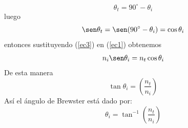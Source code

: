 \documentclass[13,twocolumn,letterpaper]{article}
\begin{document}
{\begin{equation}
		\theta_{t}=90^{\circ}-\theta_{i}
		\end{equation}
		luego 
		\begin{equation}\label{ec3}
		\sen\theta_{t}=\sen(90^{\circ}-\theta_{i})=\cos\theta_{i}
		\end{equation}
		entonces sustituyendo (\ref{ec3}) en (\ref{ec1}) obtenemos 
		\begin{equation}\label{ec4}
		n_{i}\sen\theta_{i}=n_{t}\cos\theta_{i}
		\end{equation}
		De esta manera 
		\begin{equation}\label{ec5}
		\tan\theta_{i}=\left(\dfrac{n_{t}}{n_{i}}\right)
		\end{equation}
		Así el ángulo de Brewster está dado por:
		\begin{equation}\label{ec6}
		\theta_{i}=\tan^{-1}\left(\dfrac{n_{t}}{n_{i}}\right)
		\end{equation}
	}
\end{document}
